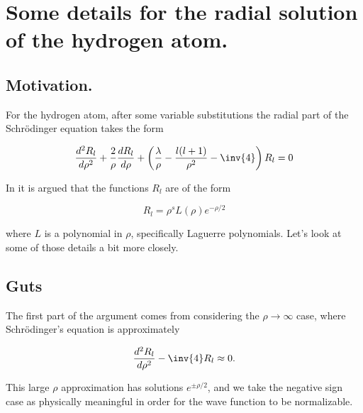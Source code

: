 
%

\chapter{Some details for the radial solution of the hydrogen atom.}
\label{chap:hyrdogenLaguerre}
{}
\date{Nov 24, 2010}

\beginArtWithToc

\section{Motivation.}

For the hydrogen atom, after some variable substitutions the radial part of the Schr\"{o}dinger equation takes the form

\begin{equation}\label{eqn:hyrdogenLaguerre:10}
\frac{d^2 R_l}{d\rho^2} + \frac{2}{\rho} \frac{d R_l}{d\rho} + \left( \frac{\lambda}{\rho} - \frac{l(l+1)}{\rho^2} - \inv{4} \right) R_l = 0
\end{equation}

In \cite{desai2009quantum} it is argued that the functions $R_l$ are of the form

\begin{equation}\label{eqn:hyrdogenLaguerre:20}
R_l = \rho^s L(\rho) e^{-\rho/2}
\end{equation}

where $L$ is a polynomial in $\rho$, specifically Laguerre polynomials.  Let's look at some of those details a bit more closely.

\section{Guts}

The first part of the argument comes from considering the $\rho \rightarrow \infty$ case, where Schr\"{o}dinger's equation is approximately

\begin{equation}\label{eqn:hyrdogenLaguerre:10a}
\frac{d^2 R_l}{d\rho^2} - \inv{4} R_l \approx 0.
\end{equation}

This large $\rho$ approximation has solutions $e^{\pm \rho/2}$, and we take the negative sign case as physically meaningful in order for the wave function to be normalizable.

